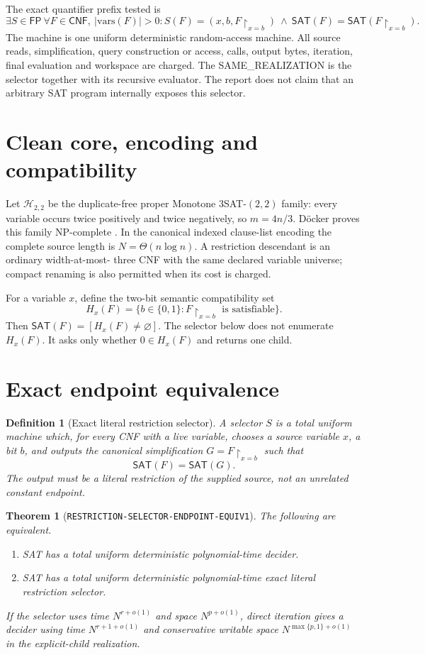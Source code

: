 \documentclass[11pt]{article}
\newtheorem{definition}{Definition}
\newtheorem{theorem}{Theorem}
\newcommand{\SAT}{\mathsf{SAT}}
\newcommand{\Htwo}{\mathcal H_{2,2}}
\begin{document}
The exact quantifier prefix tested is
\[
 \exists S\in\mathsf{FP}\ \forall F\in\mathsf{CNF},\ |\mathrm{vars}(F)|>0:
 S(F)=(x,b,F\upharpoonright_{x=b})\ \land\
 \SAT(F)=\SAT(F\upharpoonright_{x=b}).                 \tag{1}
\]
The machine is one uniform deterministic random-access machine.  All source
reads, simplification, query construction or access, calls, output bytes,
iteration, final evaluation and workspace are charged.  The SAME\_REALIZATION
is the selector together with its recursive evaluator.  The report does not
claim that an arbitrary SAT program internally exposes this selector.

\section{Clean core, encoding and compatibility}

Let $\Htwo$ be the duplicate-free proper Monotone $3$SAT-$(2,2)$ family:
every variable occurs twice positively and twice negatively, so $m=4n/3$.
D\"ocker proves this family NP-complete \cite{doecker}.  In the canonical
indexed clause-list encoding the complete source length is
$N=\Theta(n\log n)$.  A restriction descendant is an ordinary width-at-most-
three CNF with the same declared variable universe; compact renaming is also
permitted when its cost is charged.

For a variable $x$, define the two-bit semantic compatibility set
\[
 H_x(F)=\{b\in\{0,1\}:F\upharpoonright_{x=b}\text{ is satisfiable}\}.
\]
Then $\SAT(F)=[H_x(F)\ne\varnothing]$.  The selector below does not enumerate
$H_x(F)$.  It asks only whether $0\in H_x(F)$ and returns one child.

\section{Exact endpoint equivalence}

\begin{definition}[Exact literal restriction selector]
A selector $S$ is a total uniform machine which, for every CNF with a live
variable, chooses a source variable $x$, a bit $b$, and outputs the canonical
simplification $G=F\upharpoonright_{x=b}$ such that
\[
 \SAT(F)=\SAT(G).                                      \tag{2}
\]
The output must be a literal restriction of the supplied source, not an
unrelated constant endpoint.
\end{definition}

\begin{theorem}[\texttt{RESTRICTION-SELECTOR-ENDPOINT-EQUIV1}]
The following are equivalent.
\begin{enumerate}[label=(\roman*)]
\item SAT has a total uniform deterministic polynomial-time decider.
\item SAT has a total uniform deterministic polynomial-time exact literal
restriction selector.
\end{enumerate}
If the selector uses time $N^{r+o(1)}$ and space $N^{p+o(1)}$, direct
iteration gives a decider using time $N^{r+1+o(1)}$ and conservative writable
space $N^{\max\{p,1\}+o(1)}$ in the explicit-child realization.
\end{theorem}
\end{document}
